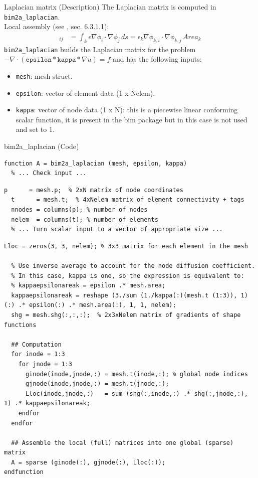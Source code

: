 \documentclass[aspectratio=54,xcolor=dvipsnames]{beamer}
\begin{document}
\begin{frame}{Laplacian matrix (Description)}
    \small
    The Laplacian matrix is computed in \texttt{bim2a\_laplacian}. \\
    Local assembly (see \cite{rylander2013}, sec. 6.3.1.1):
    \begin{align*}
        [L^{k}]_{ij} &= \int_{k} \epsilon \nabla \phi_i \cdot \nabla \phi_j \, ds = \epsilon_k \nabla \phi_{k,i} \cdot \nabla \phi_{k,j} \, Area_k
    \end{align*}
    \texttt{bim2a\_laplacian} builds the Laplacian matrix for the problem \\ 
    $- \nabla \cdot (\texttt{epsilon} * \texttt{kappa} * \nabla u) = f$  
    and has the following inputs:
    \begin{itemize}
        \item \texttt{mesh}: mesh struct.
        \item \texttt{epsilon}: vector of element data (1 x Nelem).
        \item \texttt{kappa}: vector of node data (1 x N): this is a piecewise linear conforming scalar function, it is present in the bim package but in this case is not used and set to 1.
    \end{itemize}

\end{frame}

\begin{frame}[fragile]{bim2a\_laplacian (Code)}
\scriptsize
\begin{lstlisting}[firstnumber=41]
function A = bim2a_laplacian (mesh, epsilon, kappa)
  % ... Check input ...
\end{lstlisting}
\begin{lstlisting}[firstnumber=51]
  p      = mesh.p;  % 2xN matrix of node coordinates
  t      = mesh.t;  % 4xNelem matrix of element connectivity + tags
  nnodes = columns(p); % number of nodes
  nelem  = columns(t); % number of elements
  % ... Turn scalar input to a vector of appropriate size ...
\end{lstlisting}
\begin{lstlisting}[firstnumber=69]
  Lloc = zeros(3, 3, nelem); % 3x3 matrix for each element in the mesh

  % Use inverse average to account for the node diffusion coefficient.
  % In this case, kappa is one, so the expression is equivalent to:
  % kappaepsilonareak = epsilon .* mesh.area;
  kappaepsilonareak = reshape (3./sum (1./kappa(:)(mesh.t (1:3)), 1)(:) .* epsilon(:) .* mesh.area(:), 1, 1, nelem);
  shg = mesh.shg(:,:,:);  % 2x3xNelem matrix of gradients of shape functions
  
  ## Computation
  for inode = 1:3
    for jnode = 1:3
      ginode(inode,jnode,:) = mesh.t(inode,:); % global node indices
      gjnode(inode,jnode,:) = mesh.t(jnode,:);
      Lloc(inode,jnode,:)   = sum (shg(:,inode,:) .* shg(:,jnode,:), 1) .* kappaepsilonareak;
    endfor
  endfor

  ## Assemble the local (full) matrices into one global (sparse) matrix
  A = sparse (ginode(:), gjnode(:), Lloc(:));
endfunction
\end{lstlisting}
\end{frame}
\end{document}
